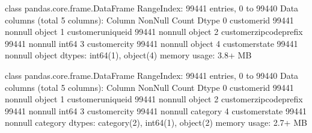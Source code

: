 \documentclass[letterpaper,10pt,english]{jupyterBook}
\begin{document}
\begin{sphinxVerbatim}[commandchars=\\\{\}]
\PYGZlt{}class \PYGZsq{}pandas.core.frame.DataFrame\PYGZsq{}\PYGZgt{}
RangeIndex: 99441 entries, 0 to 99440
Data columns (total 5 columns):
 \PYGZsh{}   Column                    Non\PYGZhy{}Null Count  Dtype 
\PYGZhy{}\PYGZhy{}\PYGZhy{}  \PYGZhy{}\PYGZhy{}\PYGZhy{}\PYGZhy{}\PYGZhy{}\PYGZhy{}                    \PYGZhy{}\PYGZhy{}\PYGZhy{}\PYGZhy{}\PYGZhy{}\PYGZhy{}\PYGZhy{}\PYGZhy{}\PYGZhy{}\PYGZhy{}\PYGZhy{}\PYGZhy{}\PYGZhy{}\PYGZhy{}  \PYGZhy{}\PYGZhy{}\PYGZhy{}\PYGZhy{}\PYGZhy{} 
 0   customer\PYGZus{}id               99441 non\PYGZhy{}null  object
 1   customer\PYGZus{}unique\PYGZus{}id        99441 non\PYGZhy{}null  object
 2   customer\PYGZus{}zip\PYGZus{}code\PYGZus{}prefix  99441 non\PYGZhy{}null  int64 
 3   customer\PYGZus{}city             99441 non\PYGZhy{}null  object
 4   customer\PYGZus{}state            99441 non\PYGZhy{}null  object
dtypes: int64(1), object(4)
memory usage: 3.8+ MB
\end{sphinxVerbatim}

\begin{sphinxVerbatim}[commandchars=\\\{\}]
\PYG{p}{[}\PYG{p}{]}  \PYG{p}{[}\PYG{p}{]}
\PYG{p}{[}\PYG{p}{]}  \PYG{p}{[}\PYG{p}{]}
\end{sphinxVerbatim}

\begin{sphinxVerbatim}[commandchars=\\\{\}]
\PYGZlt{}class \PYGZsq{}pandas.core.frame.DataFrame\PYGZsq{}\PYGZgt{}
RangeIndex: 99441 entries, 0 to 99440
Data columns (total 5 columns):
 \PYGZsh{}   Column                    Non\PYGZhy{}Null Count  Dtype   
\PYGZhy{}\PYGZhy{}\PYGZhy{}  \PYGZhy{}\PYGZhy{}\PYGZhy{}\PYGZhy{}\PYGZhy{}\PYGZhy{}                    \PYGZhy{}\PYGZhy{}\PYGZhy{}\PYGZhy{}\PYGZhy{}\PYGZhy{}\PYGZhy{}\PYGZhy{}\PYGZhy{}\PYGZhy{}\PYGZhy{}\PYGZhy{}\PYGZhy{}\PYGZhy{}  \PYGZhy{}\PYGZhy{}\PYGZhy{}\PYGZhy{}\PYGZhy{}   
 0   customer\PYGZus{}id               99441 non\PYGZhy{}null  object  
 1   customer\PYGZus{}unique\PYGZus{}id        99441 non\PYGZhy{}null  object  
 2   customer\PYGZus{}zip\PYGZus{}code\PYGZus{}prefix  99441 non\PYGZhy{}null  int64   
 3   customer\PYGZus{}city             99441 non\PYGZhy{}null  category
 4   customer\PYGZus{}state            99441 non\PYGZhy{}null  category
dtypes: category(2), int64(1), object(2)
memory usage: 2.7+ MB
\end{sphinxVerbatim}
\end{document}
